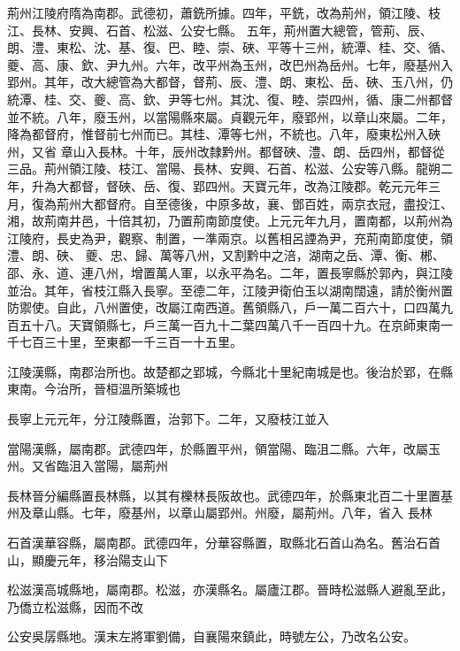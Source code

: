 \begin{pinyinscope}
 荊州江陵府隋為南郡。武德初，蕭銑所據。四年，平銑，改為荊州，領江陵、枝江、長林、安興、石首、松滋、公安七縣。
 五年，荊州置大總管，管荊、辰、朗、澧、東松、沈、基、復、巴、睦、崇、硤、平等十三州，統潭、桂、交、循、夔、高、康、欽、尹九州。六年，改平州為玉州，改巴州為岳州。七年，廢基州入郢州。其年，改大總管為大都督，督荊、辰、澧、朗、東松、岳、硤、玉八州，仍統潭、桂、交、夔、高、欽、尹等七州。其沈、復、睦、崇四州，循、康二州都督並不統。八年，廢玉州，以當陽縣來屬。貞觀元年，廢郢州，以章山來屬。二年，降為都督府，惟督前七州而已。其桂、潭等七州，不統也。八年，廢東松州入硤州，又省
 章山入長林。十年，辰州改隸黔州。都督硤、澧、朗、岳四州，都督從三品。荊州領江陵、枝江、當陽、長林、安興、石首、松滋、公安等八縣。龍朔二年，升為大都督，督硤、岳、復、郢四州。天寶元年，改為江陵郡。乾元元年三月，復為荊州大都督府。自至德後，中原多故，襄、鄧百姓，兩京衣冠，盡投江、湘，故荊南井邑，十倍其初，乃置荊南節度使。上元元年九月，置南都，以荊州為江陵府，長史為尹，觀察、制置，一準兩京。以舊相呂諲為尹，充荊南節度使，領澧、朗、硤、
 夔、忠、歸、萬等八州，又割黔中之涪，湖南之岳、潭、衡、郴、邵、永、道、連八州，增置萬人軍，以永平為名。二年，置長寧縣於郭內，與江陵並治。其年，省枝江縣入長寧。至德二年，江陵尹衛伯玉以湖南闊遠，請於衡州置防禦使。自此，八州置使，改屬江南西道。舊領縣八，戶一萬二百六十，口四萬九百五十八。天寶領縣七，戶三萬一百九十二葉四萬八千一百四十九。在京師東南一千七百三十里，至東都一千三百一十五里。



 江陵漢縣，南郡治所也。故楚都之郢城，今縣北十里紀南城是也。後治於郢，在縣東南。今治所，晉桓溫所築城也



 長寧上元元年，分江陵縣置，治郭下。二年，又廢枝江並入



 當陽漢縣，屬南郡。武德四年，於縣置平州，領當陽、臨沮二縣。六年，改屬玉州。又省臨沮入當陽，屬荊州



 長林晉分編縣置長林縣，以其有櫟林長阪故也。武德四年，於縣東北百二十里置基州及章山縣。七年，廢基州，以章山屬郢州。州廢，屬荊州。八年，省入
 長林



 石首漢華容縣，屬南郡。武德四年，分華容縣置，取縣北石首山為名。舊治石首山，顯慶元年，移治陽支山下



 松滋漢高城縣地，屬南郡。松滋，亦漢縣名。屬廬江郡。晉時松滋縣人避亂至此，乃僑立松滋縣，因而不改



 公安吳孱縣地。漢末左將軍劉備，自襄陽來鎮此，時號左公，乃改名公安。




\end{pinyinscope}
